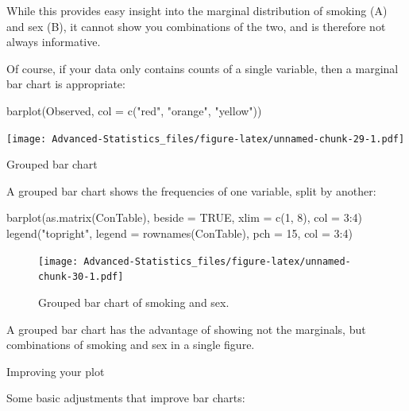 \documentclass[
]{book}
\newenvironment{Shaded}{\begin{snugshade}}{\end{snugshade}}
\newcommand{\AttributeTok}[1]{\textcolor[rgb]{0.77,0.63,0.00}{#1}}
\newcommand{\ConstantTok}[1]{\textcolor[rgb]{0.00,0.00,0.00}{#1}}
\newcommand{\DecValTok}[1]{\textcolor[rgb]{0.00,0.00,0.81}{#1}}
\newcommand{\FunctionTok}[1]{\textcolor[rgb]{0.00,0.00,0.00}{#1}}
\newcommand{\NormalTok}[1]{#1}
\newcommand{\SpecialCharTok}[1]{\textcolor[rgb]{0.00,0.00,0.00}{#1}}
\newcommand{\StringTok}[1]{\textcolor[rgb]{0.31,0.60,0.02}{#1}}
\begin{document}
While this provides easy insight into the marginal distribution of smoking (A) and sex (B), it cannot show you combinations of the two, and is therefore not always informative.

Of course, if your data only contains counts of a single variable, then a marginal bar chart is appropriate:

\begin{Shaded}
\begin{Highlighting}[]
\FunctionTok{barplot}\NormalTok{(Observed, }\AttributeTok{col =} \FunctionTok{c}\NormalTok{(}\StringTok{"red"}\NormalTok{, }\StringTok{"orange"}\NormalTok{, }\StringTok{"yellow"}\NormalTok{))}
\end{Highlighting}
\end{Shaded}

\texttt{[image: Advanced-Statistics\_files/figure-latex/unnamed-chunk-29-1.pdf]}

Grouped bar chart

A grouped bar chart shows the frequencies of one variable, split by another:

\begin{Shaded}
\begin{Highlighting}[]
\FunctionTok{barplot}\NormalTok{(}\FunctionTok{as.matrix}\NormalTok{(ConTable), }\AttributeTok{beside =} \ConstantTok{TRUE}\NormalTok{, }\AttributeTok{xlim =} \FunctionTok{c}\NormalTok{(}\DecValTok{1}\NormalTok{, }\DecValTok{8}\NormalTok{), }\AttributeTok{col =} \DecValTok{3}\SpecialCharTok{:}\DecValTok{4}\NormalTok{)}
\FunctionTok{legend}\NormalTok{(}\StringTok{"topright"}\NormalTok{, }\AttributeTok{legend =} \FunctionTok{rownames}\NormalTok{(ConTable), }\AttributeTok{pch =} \DecValTok{15}\NormalTok{, }\AttributeTok{col =} \DecValTok{3}\SpecialCharTok{:}\DecValTok{4}\NormalTok{)}
\end{Highlighting}
\end{Shaded}

\begin{figure}
\centering
\texttt{[image: Advanced-Statistics\_files/figure-latex/unnamed-chunk-30-1.pdf]}
\caption{\label{fig:unnamed-chunk-30}Grouped bar chart of smoking and sex.}
\end{figure}

A grouped bar chart has the advantage of showing not the marginals, but combinations of smoking and sex in a single figure.

Improving your plot

Some basic adjustments that improve bar charts:
\end{document}
